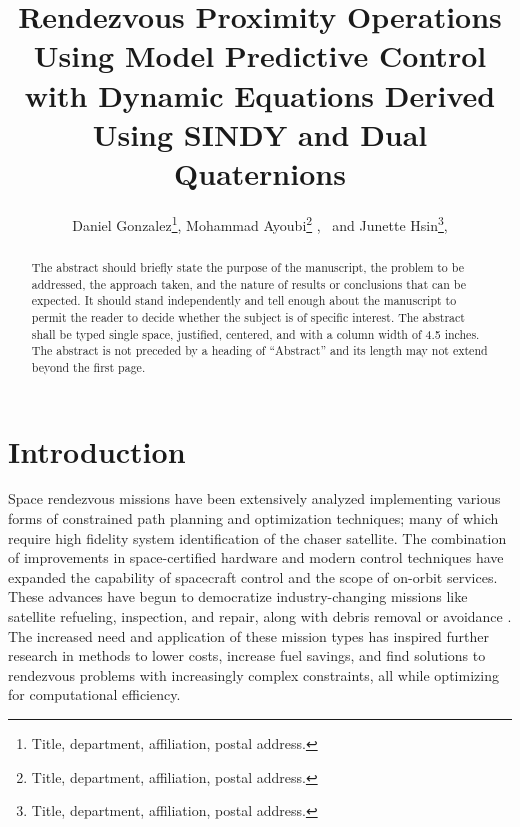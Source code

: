 \documentclass[letterpaper, preprint, paper,11pt]{AAS}	%
\begin{document}
\title{Rendezvous Proximity Operations Using Model Predictive Control with Dynamic Equations Derived Using SINDY and Dual Quaternions}

\author{Daniel Gonzalez\thanks{Title, department, affiliation, postal address.},
	 Mohammad Ayoubi\thanks{Title, department, affiliation, postal address.} , 
\ and Junette Hsin\thanks{Title, department, affiliation, postal address.}, 
}


\maketitle{} 		


\begin{abstract}
	
The abstract should briefly state the purpose of the manuscript, the problem to be addressed, the approach taken, and the nature of results or conclusions that can be expected. It should stand independently and tell enough about the manuscript to permit the reader to decide whether the subject is of specific interest. The abstract shall be typed single space, justified, centered, and with a column width of 4.5 inches. The abstract is not preceded by a heading of ``Abstract'' and its length may not extend beyond the first page.

\end{abstract}








\section{Introduction}
%

Space rendezvous missions have been extensively analyzed implementing various forms of constrained path planning and optimization techniques; many of which require high fidelity system identification of the chaser satellite. The combination of improvements in space-certified hardware and modern control techniques have expanded the capability of spacecraft control and the scope of on-orbit services. These advances have begun to democratize industry-changing missions like satellite refueling, inspection, and repair, along with debris removal or avoidance \cite{ParkZagaris_AnalysisandExperimention,cairano_park_MPC}. The increased need and application of these mission types has inspired further research in methods to lower costs, increase fuel savings, and find solutions to rendezvous problems with increasingly complex constraints, all while optimizing for computational efficiency.
\end{document}
